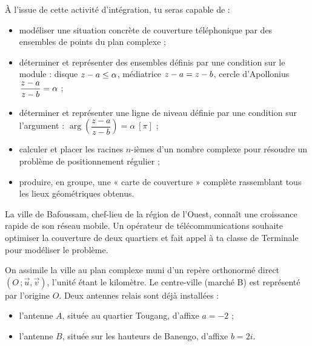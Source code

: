 \documentclass[11pt]{article}
\providecommand{\abs}{}\let\abs\relax\DeclarePairedDelimiter{\abs}{\lvert}{\rvert}
\newcommand{\cle}[1]{{\popxbold\color{popdark}#1}}
\newcounter{popsec}
\newcounter{popsub}
\newcommand{\courssub}[1]{%
  \stepcounter{popsub}%
  \par\vspace{9pt}\noindent{\popxbold\fontsize{11.5}{13}\selectfont\color{popink}{\color{poporange}\thepopsec.\thepopsub}\hspace{6pt}#1}\par\nopagebreak\vspace{4pt}
}
\begin{document}
À l'issue de cette activité d'intégration, tu seras capable de :
\begin{itemize}
\item modéliser une situation concrète de couverture téléphonique par des ensembles de points du plan complexe ;
\item déterminer et représenter des ensembles définis par une condition sur le module : disque $\abs{z-a}\leq\alpha$, médiatrice $\abs{z-a}=\abs{z-b}$, cercle d'Apollonius $\abs{\dfrac{z-a}{z-b}}=\alpha$ ;
\item déterminer et représenter une ligne de niveau définie par une condition sur l'argument : $\arg\!\left(\dfrac{z-a}{z-b}\right)=\alpha\ [\pi]$ ;
\item calculer et placer les racines $n$-ièmes d'un nombre complexe pour résoudre un problème de positionnement régulier ;
\item produire, en groupe, une « carte de couverture » complète rassemblant tous les lieux géométriques obtenus.
\end{itemize}

\courssub{Situation}

La ville de Bafoussam, chef-lieu de la région de l'Ouest, connaît une croissance rapide de son réseau mobile. Un opérateur de télécommunications souhaite optimiser la couverture de deux quartiers et fait appel à ta classe de Terminale pour modéliser le problème.

On assimile la ville au \cle{plan complexe} muni d'un repère orthonormé direct $(O\,;\vec{u},\vec{v})$, l'unité étant le kilomètre. Le centre-ville (marché B) est représenté par l'origine $O$. Deux antennes relais sont déjà installées :
\begin{itemize}
\item l'antenne $A$, située au quartier Tougang, d'affixe $a=-2$ ;
\item l'antenne $B$, située sur les hauteurs de Banengo, d'affixe $b=2i$.
\end{itemize}
\end{document}
